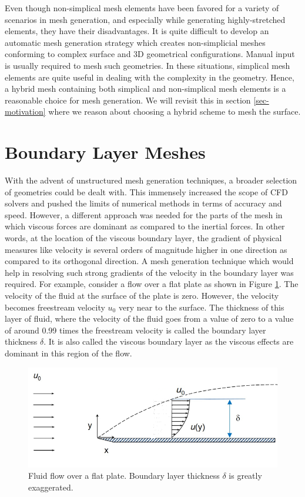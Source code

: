 Even though non-simplical mesh elements have been favored for a variety of scenarios in mesh generation, and especially while generating highly-stretched elements, they have their disadvantages. It is quite difficult to develop an automatic mesh generation strategy which creates non-simplicial meshes conforming to complex surface and 3D geometrical configurations. Manual input is usually required to mesh such geometries. In these situations, simplical mesh elements are quite useful in dealing with the complexity in the geometry. Hence, a hybrid mesh containing both simplical and non-simplical mesh elements is a reasonable choice for mesh generation. We will revisit this in section \ref{sec-motivation} where we reason about choosing a hybrid scheme to mesh the surface.

\section{Boundary Layer Meshes}
\label{sec-boundaryLayerMesh}

With the advent of unstructured mesh generation techniques, a broader selection of geometries could be dealt with. This immensely increased the scope of CFD solvers and pushed the limits of numerical methods in terms of accuracy and speed. However, a different approach was needed for the parts of the mesh in which viscous forces are dominant as compared to the inertial forces. In other words, at the location of the viscous boundary layer, the gradient of physical measures like velocity is several orders of magnitude higher in one direction as compared to its orthogonal direction. A mesh generation technique which would help in resolving such strong gradients of the velocity in the boundary layer was required. For example, consider a flow over a flat plate as shown in Figure \ref{fig-boundaryLayer}. The velocity of the fluid at the surface of the plate is zero. However, the velocity becomes freestream velocity $u_0$ very near to the surface. The thickness of this layer of fluid, where the velocity of the fluid goes from a value of zero to a value of around 0.99 times the freestream velocity is called the boundary layer thickness $\delta$. It is also called the viscous boundary layer as the viscous effects are dominant in this region of the flow.

\begin{figure}
  \centering	
  \includegraphics[width=0.8\linewidth]{img/intro/boundaryLayer.png}
  \caption{Fluid flow over a flat plate. Boundary layer thickness $\delta$ is greatly exaggerated.}
  \label{fig-boundaryLayer}
\end{figure}

